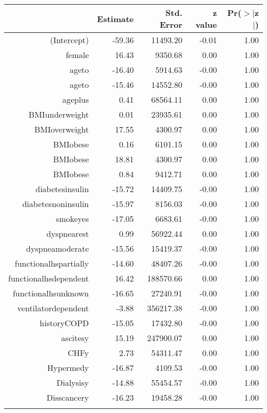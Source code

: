 \bigskip\bigskip
\centering
\begin{tabular}{rrrrr}
  \hline
 & Estimate & Std. Error & z value & Pr($>$$|$z$|$) \\ 
  \hline
(Intercept) & -59.36 & 11493.20 & -0.01 & 1.00 \\ 
  female & 16.43 & 9350.68 & 0.00 & 1.00 \\ 
  age\-65\-to\-74 & -16.40 & 5914.63 & -0.00 & 1.00 \\ 
  age\-75\-to\-84 & -15.46 & 14552.80 & -0.00 & 1.00 \\ 
  age\-85\-plus & 0.41 & 68564.11 & 0.00 & 1.00 \\ 
  BMI\-underweight & 0.01 & 23935.61 & 0.00 & 1.00 \\ 
  BMI\-overweight & 17.55 & 4300.97 & 0.00 & 1.00 \\ 
  BMI\-obese\-1 & 0.16 & 6101.15 & 0.00 & 1.00 \\ 
  BMI\-obese\-2 & 18.81 & 4300.97 & 0.00 & 1.00 \\ 
  BMI\-obese\-3 & 0.84 & 9412.71 & 0.00 & 1.00 \\ 
  diabetes\-insulin & -15.72 & 14409.75 & -0.00 & 1.00 \\ 
  diabetes\-noninsulin & -15.97 & 8156.03 & -0.00 & 1.00 \\ 
  smoke\-yes & -17.05 & 6683.61 & -0.00 & 1.00 \\ 
  dyspnea\-rest & 0.99 & 56922.44 & 0.00 & 1.00 \\ 
  dyspnea\-moderate & -15.56 & 15419.37 & -0.00 & 1.00 \\ 
  functional\-hs\-partially & -14.60 & 48407.26 & -0.00 & 1.00 \\ 
  functional\-hs\-dependent & 16.42 & 188570.66 & 0.00 & 1.00 \\ 
  functional\-hs\-unknown & -16.65 & 27240.91 & -0.00 & 1.00 \\ 
  ventilator\-dependent & -3.88 & 356217.38 & -0.00 & 1.00 \\ 
  history\-COPD & -15.05 & 17432.80 & -0.00 & 1.00 \\ 
  ascites\-y & 15.19 & 247900.07 & 0.00 & 1.00 \\ 
  CHF\-y & 2.73 & 54311.47 & 0.00 & 1.00 \\ 
  Hyper\-med\-y & -16.87 & 4109.53 & -0.00 & 1.00 \\ 
  Dialysis\-y & -14.88 & 55454.57 & -0.00 & 1.00 \\ 
  Diss\-cancer\-y & -16.23 & 19458.28 & -0.00 & 1.00 \\ 
$$
\end{tabular}
